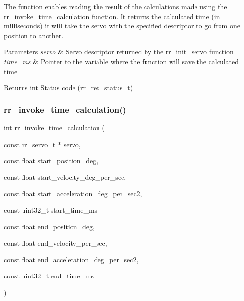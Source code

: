 The function enables reading the result of the calculations made using the \hyperlink{group___servo__info_ga33c16ac8844acb025f57fd3e5d946f11}{rr\+\_\+invoke\+\_\+time\+\_\+calculation} function. It returns the calculated time (in milliseconds) it will take the servo with the specified descriptor to go from one position to another. 


\begin{DoxyParams}{Parameters}
{\em servo} & Servo descriptor returned by the \hyperlink{group___common_ga0adb313a3eeb8a4399431e940a1f3e9e}{rr\+\_\+init\+\_\+servo} function \\
\hline
{\em time\+\_\+ms} & Pointer to the variable where the function will save the calculated time \\
\hline
\end{DoxyParams}
\begin{DoxyReturn}{Returns}
int Status code (\hyperlink{api_8h_a92d5be5038abcf89837faf85a08debdc}{rr\+\_\+ret\+\_\+status\+\_\+t}) 
\end{DoxyReturn}
\mbox{\label{group___servo__info_ga33c16ac8844acb025f57fd3e5d946f11}} 
\subsubsection{\texorpdfstring{rr\+\_\+invoke\+\_\+time\+\_\+calculation()}{rr\_invoke\_time\_calculation()}}
{\footnotesize\ttfamily int rr\+\_\+invoke\+\_\+time\+\_\+calculation (\begin{DoxyParamCaption}\item[{const \hyperlink{structrr__servo__t}{rr\+\_\+servo\+\_\+t} $\ast$}]{servo,  }\item[{const float}]{start\+\_\+position\+\_\+deg,  }\item[{const float}]{start\+\_\+velocity\+\_\+deg\+\_\+per\+\_\+sec,  }\item[{const float}]{start\+\_\+acceleration\+\_\+deg\+\_\+per\+\_\+sec2,  }\item[{const uint32\+\_\+t}]{start\+\_\+time\+\_\+ms,  }\item[{const float}]{end\+\_\+position\+\_\+deg,  }\item[{const float}]{end\+\_\+velocity\+\_\+per\+\_\+sec,  }\item[{const float}]{end\+\_\+acceleration\+\_\+deg\+\_\+per\+\_\+sec2,  }\item[{const uint32\+\_\+t}]{end\+\_\+time\+\_\+ms }\end{DoxyParamCaption})}



